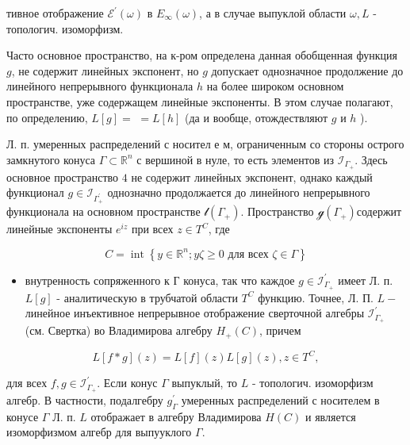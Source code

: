 \documentclass[10pt]{article}
\begin{document}
тивное отображение $\mathscr{E}^{\prime}(\omega)$ в $E_{\infty}(\omega)$, а в случае выпуклой области $\omega, L$ - топологич. изоморфизм.



Часто основное пространство, на к-ром определена данная обобщенная функция $g$, не содержит линейных экспонент, но $g$ допускает однозначное продолжение до линейного непрерывного функционала $h$ на более широком основном пространстве, уже содержащем линейные экспоненты. В этом случае полагают, по определению, $L[g]=$ $=L[h]$ (да и вообще, отождествляют $g$ и $h$ ).



Л. п. умеренных распределений с носител е м, ограниченным со стороны острого замкнутого конуса $\Gamma \subset \mathbb{R}^{n}$ с вершиной в нуле, то есть элементов из $\mathscr{I}_{\Gamma_{+}}$. Здесь основное пространство $\mathscr{4}$ не содержит линейных экспонент, однако каждый функционал $g \in \mathscr{I}_{\Gamma_{+}^{\prime}}$ однозначно продолжается до линейного непрерывного функционала на основном пространстве $\mathscr{l}\left(\Gamma_{+}\right)$. Пространство $\mathcal{g}\left(\Gamma_{+}\right)$содержит линейные экспоненты $e^{i z}$ при всех $z \in T^{C}$, где



\[

C=\operatorname{int}\left\{y \in \mathbb{R}^{n} ; y \zeta \geqslant 0 \text { для всех } \zeta \in \Gamma\right\}

\]



\begin{itemize}

  \item внутренность сопряженного к Г конуса, так что каждое $g \in \mathscr{I}_{\Gamma_{+}}^{\prime}$ имеет Л. п. $L[g]$ - аналитическую в трубчатой области $T^{C}$ функцию. Точнее, Л. П. $L-$ линейное инъективное непрерывное отображение сверточной алгебры $\mathscr{I}_{\Gamma_{+}}^{\prime}$ (см. Свертка) во Владимирова алгебру $H_{+}(C)$, причем

\end{itemize}



\[

L[f * g](z)=L[f](z) L[g](z), z \in T^{C},

\]



для всех $f, g \in \mathscr{I}_{\Gamma_{+}}^{\prime}$. Если конус $\Gamma$ выпуклый, то $L$ - топологич. изоморфизм алгебр. В частности, подалгебру $g_{\Gamma}^{\prime}$ умеренных распределений с носителем в конусе $\Gamma$ Л. п. $L$ отображает в алгебру Владимирова $H(C)$ и является изоморфизмом алгебр для выпууклого $\Gamma$.
\end{document}
